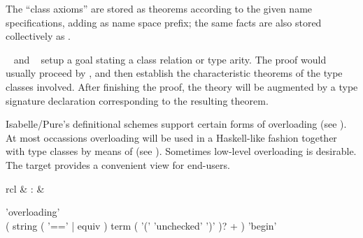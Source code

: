\begin{isabellebody}
\begin{isamarkuptext}
\begin{descr}
  The ``class axioms'' are stored as theorems according to the given
  name specifications, adding  as name space prefix;
  the same facts are also stored collectively as .
  
  \item [\mbox{\isa{\isacommand{instance}}}~\isa{c\isactrlsub {\isadigit{1}}\ {\isasymsubseteq}\ c\isactrlsub {\isadigit{2}}} and
  \mbox{\isa{\isacommand{instance}}}~\isa{t\ {\isacharcolon}{\isacharcolon}\ {\isacharparenleft}s\isactrlsub {\isadigit{1}}{\isacharcomma}\ {\isasymdots}{\isacharcomma}\ s\isactrlsub n{\isacharparenright}\ s}]
  setup a goal stating a class relation or type arity.  The proof
  would usually proceed by \mbox{}, and then establish
  the characteristic theorems of the type classes involved.  After
  finishing the proof, the theory will be augmented by a type
  signature declaration corresponding to the resulting theorem.

  \end{descr}%
\end{isamarkuptext}%
\isamarkuptrue%
%
\isamarkuptrue%
%
\begin{isamarkuptext}%
Isabelle/Pure's definitional schemes support certain forms of
  overloading (see ).  At most occassions
  overloading will be used in a Haskell-like fashion together with
  type classes by means of \mbox{} (see
  ).  Sometimes low-level overloading is desirable.
  The \mbox{} target provides a convenient view for
  end-users.

  \begin{matharray}{rcl}
    \mbox{} & : &  \\
  \end{matharray}

  \begin{rail}
    'overloading' \\
    ( string ( '==' | equiv ) term ( '(' 'unchecked' ')' )? + ) 'begin'
  \end{rail}

  \begin{descr}


\end{descr}
\end{isamarkuptext}
\end{isabellebody}
